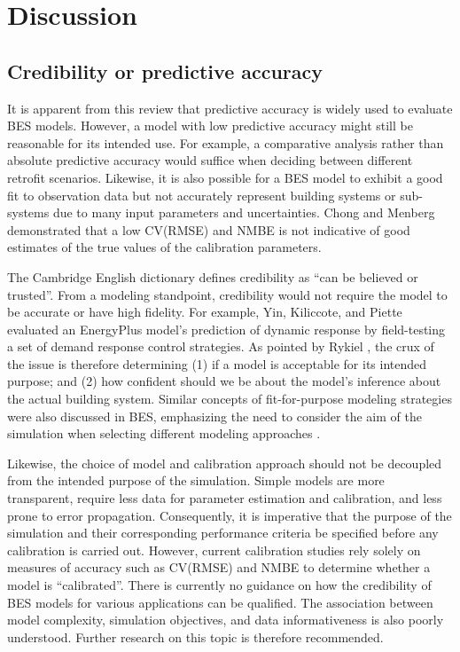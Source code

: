 \documentclass[review]{elsarticle}
\begin{document}
\section{Discussion}

\subsection{Credibility or predictive accuracy} \label{sec:credibility}

It is apparent from this review that predictive accuracy is widely used to evaluate BES models. However, a model with low predictive accuracy might still be reasonable for its intended use. For example, a comparative analysis rather than absolute predictive accuracy would suffice when deciding between different retrofit scenarios. Likewise, it is also possible for a BES model to exhibit a good fit to observation data but not accurately represent building systems or sub-systems due to many input parameters and uncertainties. Chong and Menberg \cite{chong2018guidelines} demonstrated that a low CV(RMSE) and NMBE is not indicative of good estimates of the true values of the calibration parameters. 

The Cambridge English dictionary defines credibility as ``can be believed or trusted''. From a modeling standpoint, credibility would not require the model to be accurate or have high fidelity. For example, Yin, Kiliccote, and Piette \cite{yin2016linking} evaluated an EnergyPlus model's prediction of dynamic response by field-testing a set of demand response control strategies. As pointed by Rykiel \cite{rykiel1996testing}, the crux of the issue is therefore determining (1) if a model is acceptable for its intended purpose; and (2) how confident should we be about the model's inference about the actual building system. Similar concepts of fit-for-purpose modeling strategies were also discussed in BES, emphasizing the need to consider the aim of the simulation when selecting different modeling approaches \cite{trvcka2010overview, gaetani2016occupant, gaetani2020stepwise, chong2021occupancy, zhan2021data}. 

Likewise, the choice of model and calibration approach should not be decoupled from the intended purpose of the simulation. Simple models are more transparent, require less data for parameter estimation and calibration, and less prone to error propagation. Consequently, it is imperative that the purpose of the simulation and their corresponding performance criteria be specified before any calibration is carried out. However, current calibration studies rely solely on measures of accuracy such as CV(RMSE) and NMBE to determine whether a model is ``calibrated''. There is currently no guidance on how the credibility of BES models for various applications can be qualified. The association between model complexity, simulation objectives, and data informativeness is also poorly understood. Further research on this topic is therefore recommended. 
\end{document}
